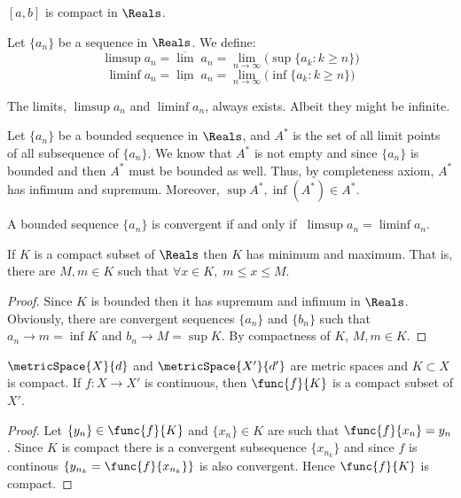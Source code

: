 \begin{corollary}
    \([a,b]\) is compact in \(\Reals\).
\end{corollary}

Let \(\{a_n\}\) be a sequence in \(\Reals\). We define:
\[ \limsup a_n = \overline{\lim} \; a_n = \lim_{n \to \infty}{\Big(\sup{\{a_k : k\geq n\}}\Big)}\]
\[ \liminf a_n = \underline{\lim} \; a_n = \lim_{n \to \infty}{\Big(\inf{\{a_k : k\geq n\}}\Big)}\]

\begin{note}
    The limits, \(\limsup a_n \) and \(\liminf a_n\), always exists. Albeit they might be infinite.
\end{note}

Let \(\{a_n\}\) be a bounded sequence in \(\Reals\), and \(A^*\) is the set of all limit points of all subsequence of  \(\{a_n\}\). We know that \(A^*\) is not empty and since  \(\{a_n\}\) is bounded and then \(A^*\) must be bounded as well. Thus, by completeness axiom, \(A^*\) has infimum and supremum. Moreover, \(\sup{A^*}, \inf(A^*) \in A^*\).

\begin{proposition}
    A bounded sequence \(\{a_n\}\) is convergent if and only if \(\;\limsup a_n = \liminf a_n\).
\end{proposition}

\begin{corollary}
    If \(K\) is a compact subset of \(\Reals\) then \(K\) has minimum and maximum. That is, there are \(M,m \in K\) such that \(\forall x \in K,\; m \leq x \leq M\).
\end{corollary}

\begin{proof}
    Since \(K\) is bounded then it has supremum and infimum in \(\Reals\). Obviously, there are convergent sequences \(\{a_n\}\) and \(\{b_n\}\) such that \(a_n \to m = \inf K\) and \(b_n \to M = \sup K\). By compactness of \(K\), \(M,m \in K\).
\end{proof}

\begin{theorem}
    \(\metricSpace{X}{d}\) and \(\metricSpace{X'}{d'}\) are metric spaces and \(K \subset X\) is compact. If \(f : X \to X'\) is continuous, then \(\func{f}{K}\) is a compact subset of \(X'\).
\end{theorem}

\begin{proof}
    Let \(\{y_n\} \in \func{f}{K}\) and \(\{x_n\} \in K\) are such that \(\func{f}{x_n} = y_n\). Since \(K\) is compact there is a convergent subsequence \(\{x_{n_k}\}\) and since \(f\) is continous \( \{ y_{n_k} = \func{f}{x_{n_k}}\}\) is also convergent. Hence \(\func{f}{K}\) is compact.
\end{proof}

